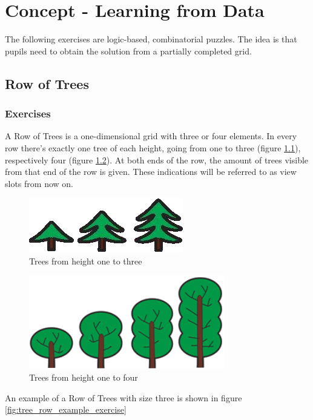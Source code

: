 \chapter{Concept - Learning from Data}
\label{chapter:learningFromData}

The following exercises are logic-based, combinatorial puzzles. The idea is that pupils need to obtain the solution from a partially completed grid.

\section{Row of Trees}
\label{section:treeRow}

\subsection{Exercises}
A Row of Trees is a one-dimensional grid with three or four elements. In every row there's exactly one tree of each height, going from one to three (figure \ref{fig:trees_3}), respectively four (figure \ref{fig:trees_4}). At both ends of the row, the amount of trees visible from that end of the row is given. These indications will be referred to as view slots from now on.

\begin{figure} 
    \centering
    \includegraphics[width=0.4 \columnwidth]{figures/trees_3.png}
    \caption{Trees from height one to three} 
    \label{fig:trees_3} 
\end{figure}

\begin{figure} 
    \centering
    \includegraphics[width=0.4 \columnwidth]{figures/trees_4.png}
    \caption{Trees from height one to four} 
    \label{fig:trees_4} 
\end{figure}

\begin{example}
    An example of a Row of Trees with size three is shown in figure \ref{fig:tree_row_example_exercise}
\end{example}

